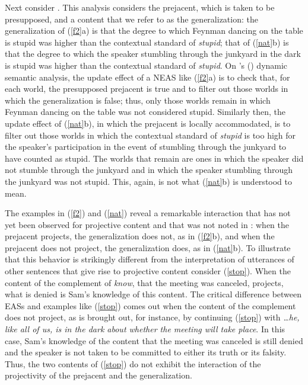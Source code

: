 \documentclass[11pt,fleqn]{article}
\newcommand{\6}{\mbox{$[\hspace*{-.6mm}[$}}
\newcommand{\9}{\mbox{$]\hspace*{-.6mm}]$}}
\newcommand{\citetpos}[1]{\citeauthor{#1}'s (\citeyear{#1})}
\begin{document}
Next consider \citealt{barker02}. This analysis considers the prejacent, which is taken to be presupposed, and a content that we refer to as the generalization: the generalization of (\ref{f2}a) is that the degree to which Feynman dancing on the table is stupid was higher than the contextual standard of {\em stupid}; that of (\ref{nat}b) is that the degree to which the speaker stumbling through the junkyard in the dark is stupid was higher than the contextual standard of {\em stupid}. On \citetpos{barker02} dynamic semantic analysis, the update effect of a NEAS like (\ref{f2}a) is to check that, for each world, the presupposed prejacent is true and to filter out those worlds in which the generalization is false; thus, only those worlds remain in which Feynman dancing on the table was not considered stupid. Similarly then, the update effect of (\ref{nat}b), in which the prejacent is locally accommodated, is to filter out those worlds in which the contextual standard of {\em stupid} is too high for the speaker's participation in the event of stumbling through the junkyard to have counted as stupid. The worlds that remain are ones in which the speaker did not stumble through the junkyard and in which the speaker stumbling through the junkyard was not stupid. This, again, is not what (\ref{nat}b) is understood to mean. 

The examples in (\ref{f2}) and (\ref{nat}) reveal a remarkable interaction that has not yet been observed for projective content and that was not noted in \citealt{karttunen-etal2014}: when the prejacent projects, the generalization does not, as in (\ref{f2}b), and when the prejacent does not project, the generalization does, as in (\ref{nat}b). To illustrate that this behavior is strikingly different from the interpretation of utterances of other sentences that give rise to projective content consider  (\ref{stop}). When the content of the complement of {\em know}, that the meeting was canceled, projects, what is denied is Sam's knowledge of this content. The critical difference between EASs and examples like (\ref{stop}) comes out when the content of the complement does not project, as is brought out, for instance, by continuing (\ref{stop}) with {\em \ldots he, like all of us, is in the dark about whether the meeting will take place}. In this case, Sam's knowledge of the content that the meeting was canceled is still denied and the speaker is not taken to be committed to either its truth or its falsity. Thus, the two contents of (\ref{stop}) do not exhibit the interaction of the projectivity of the prejacent and the generalization.
\end{document}
